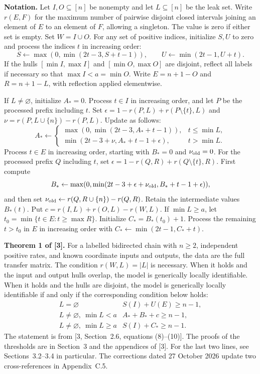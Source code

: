 \documentclass[11pt,a4paper]{article}
\begin{document}
\noindent\textbf{Notation.} Let \(I,O\subseteq[n]\) be nonempty and let \(L\subseteq[n]\) be the leak set. Write \(r(E,F)\) for the maximum number of pairwise disjoint closed intervals joining an element of \(E\) to an element of \(F\), allowing a singleton. The value is zero if either set is empty. Set \(W=I\cup O\). For any set of positive indices, initialize \(S,U\) to zero and process the indices \(t\) in increasing order:
\[
 S\gets\max(0,\min(2t-3,S+t-1)),\qquad U\gets\min(2t-1,U+t).
\]
If the hulls \([\min I,\max I]\) and \([\min O,\max O]\) are disjoint, reflect all labels if necessary so that \(\max I<a=\min O\). Write \(E=n+1-O\) and \(R=n+1-L\), with reflection applied elementwise.

If \(L\ne\varnothing\), initialize \(A_*=0\). Process \(t\in I\) in increasing order, and let \(P\) be the processed prefix including \(t\). Set \(\epsilon=1-r(P,L)+r(P\setminus\{t\},L)\) and \(\nu=r(P,L\cup\{n\})-r(P,L)\). Update as follows:
\[
 A_*\gets
 \begin{cases}
 \max(0,\min(2t-3,A_*+t-1)),&t\le\min L,\\
 \min(2t-3+\nu,A_*+t-1+\epsilon),&t>\min L .
 \end{cases}
\]
Process \(t\in E\) in increasing order, starting with \(B_*=0\) and \(\nu_{\rm old}=0\). For the processed prefix \(Q\) including \(t\), set \(\epsilon=1-r(Q,R)+r(Q\setminus\{t\},R)\). First compute
\[
 B_*\gets\max(0,\min(2t-3+\epsilon+\nu_{\rm old},B_*+t-1+\epsilon)),
\]
and then set \(\nu_{\rm old}\gets r(Q,R\cup\{n\})-r(Q,R)\). Retain the intermediate values \(B_*(t)\). Put \(c=r(I,L)+r(O,L)-r(W,L)\). If \(\min L\ge a\), let \(t_0=\min\{t\in E:t\ge\max R\}\). Initialize \(C_*=B_*(t_0)+1\). Process the remaining \(t>t_0\) in \(E\) in increasing order with \(C_*\gets\min(2t-1,C_*+t)\).

\noindent\textbf{Theorem 1 of [3].}
For a labelled bidirected chain with \(n\ge2\), independent positive rates, and known coordinate inputs and outputs, the data are the full transfer matrix. The condition \(r(W,L)=|L|\) is necessary. When it holds and the input and output hulls overlap, the model is generically locally identifiable. When it holds and the hulls are disjoint, the model is generically locally identifiable if and only if the corresponding condition below holds:
\begin{equation}
\begin{array}{ll}
 L=\varnothing & S(I)+U(E)\ge n-1,\\
 L\ne\varnothing,\ \min L<a & A_*+B_*+c\ge n-1,\\
 L\ne\varnothing,\ \min L\ge a & S(I)+C_*\ge n-1.
\end{array}                                                     \label{eq:placement}
\end{equation}
The statement is from [3, Section~2.6, equations (8)--(10)]. The proofs of the thresholds are in Section~3 and the appendices of [3]. For the last two lines, see Sections~3.2--3.4 in particular. The corrections dated 27 October 2026 update two cross-references in Appendix~C.5.
\end{document}
